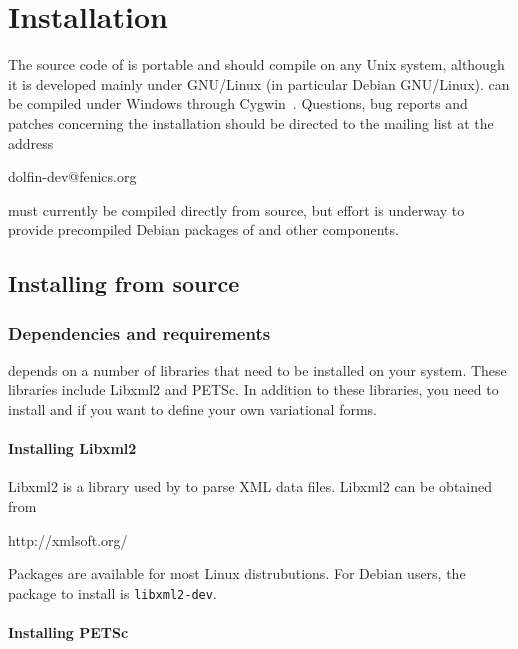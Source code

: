 \chapter{Installation}
\label{app:installation}

The source code of \dolfin{} is portable and should compile on any
Unix system, although it is developed mainly under GNU/Linux (in 
particular Debian GNU/Linux). \dolfin{} can be compiled under Windows
through Cygwin~\cite{www:Cygwin}. Questions, bug reports and patches
concerning the installation should be directed to the \dolfin{} mailing 
list at the address
\begin{code}
  dolfin-dev@fenics.org
\end{code}

\dolfin{} must currently be compiled directly from source, but effort
is underway to provide precompiled Debian packages of \dolfin{} and
other \fenics{} components.

\section{Installing from source}

\subsection{Dependencies and requirements}

\dolfin{} depends on a number of libraries that need to be installed on your
system. These libraries include Libxml2 and PETSc. In addition to these 
libraries, you need to install \fiat{} and \ffc{} if you want to define your 
own variational forms.

\subsubsection{Installing Libxml2}

Libxml2 is a library used by \dolfin{} to parse XML data files. Libxml2 can be
obtained from
\begin{code}
  http://xmlsoft.org/
\end{code}
Packages are available for most Linux distrubutions. For Debian users, the 
package to install is \texttt{libxml2-dev}.

\subsubsection{Installing PETSc}

